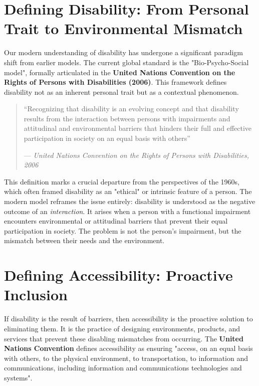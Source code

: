 \documentclass{scrbook}
\begin{document}
\section{Defining Disability: From Personal Trait to Environmental Mismatch}

Our modern understanding of disability has undergone a significant paradigm shift from earlier models. The current global standard is the "Bio-Psycho-Social model", formally articulated in the \textbf{United Nations Convention on the Rights of Persons with Disabilities (2006)}. This framework defines disability not as an inherent personal trait but as a contextual phenomenon.


\begin{quote}
“Recognizing that disability is an evolving concept and that disability results from the interaction between persons with impairments and attitudinal and environmental barriers that hinders their full and effective participation in society on an equal basis with others”

— \textit{United Nations Convention on the Rights of Persons with Disabilities, 2006}
\end{quote}

This definition marks a crucial departure from the perspectives of the 1960s, which often framed disability as an "ethical" or intrinsic feature of a person. The modern model reframes the issue entirely: disability is understood as the negative outcome of an \textit{interaction}. It arises when a person with a functional impairment encounters environmental or attitudinal barriers that prevent their equal participation in society. The problem is not the person's impairment, but the mismatch between their needs and the environment.

\section{Defining Accessibility: Proactive Inclusion}

If disability is the result of barriers, then accessibility is the proactive solution to eliminating them. It is the practice of designing environments, products, and services that prevent these disabling mismatches from occurring. The \textbf{United Nations Convention} defines accessibility as ensuring "access, on an equal basis with others, to the physical environment, to transportation, to information and communications, including information and communications technologies and systems". \\
\end{document}
